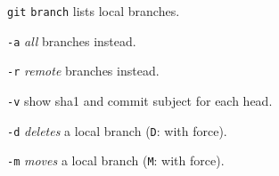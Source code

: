 %

\begin{compactenum}
\item [\texttt{git}] \texttt{branch} lists local branches.
\item [\texttt{-a}] \emph{all} branches instead.
\item [\texttt{-r}] \emph{remote} branches instead.
\item [\texttt{-v}] show sha1 and commit subject for each head.
\item [\texttt{-d}] \emph{deletes} a local branch (\texttt{D}: with force).
\item [\texttt{-m}] \emph{moves} a local branch (\texttt{M}: with force).
\end{compactenum}

%